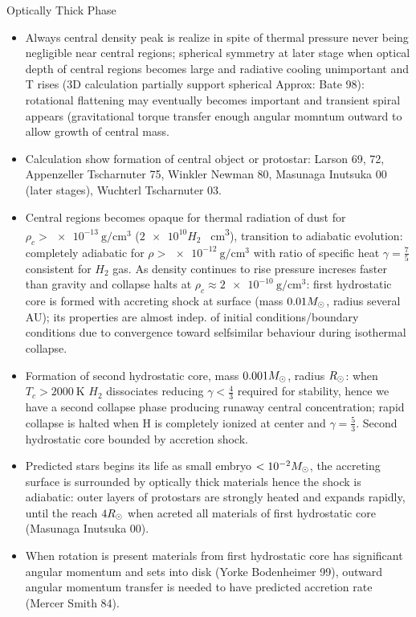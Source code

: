 \begin{frame}{Optically Thick Phase}
    \begin{itemize}
        \item Always central density peak is realize in spite of thermal pressure never being negligible near central regions; spherical symmetry at later stage when optical depth of central regions becomes large and radiative cooling unimportant and T rises (3D calculation partially support spherical Approx: Bate 98): rotational flattening may eventually becomes important and transient spiral appears (gravitational torque transfer enough angular momntum outward to allow growth of central mass.
            \item Calculation show formation of central object or protostar: Larson 69, 72, Appenzeller Tscharnuter 75, Winkler Newman 80, Masunaga Inutsuka 00 (later stages), Wuchterl Tscharnuter 03.
            \item Central regions becomes opaque for thermal radiation of dust for $\rho_c>\SI{e-13}{\gram\per\cubic\cm}$ ($\num{2e10} H_2$ \si{\per\cubic\cm}), transition to adiabatic evolution: completely adiabatic for $\rho>\SI{e-12}{\gram\per\cubic\cm}$ with ratio of specific heat $\gamma=\frac{7}{5}$ consistent for $H_2$ gas. As density continues to rise pressure increses faster than gravity and collapse halts at $\rho_c\approx\SI{2e-10}{\gram\per\cubic\cm}$: first hydrostatic core is formed with accreting shock at surface (mass $0.01 M_{\odot}{}$, radius several AU); its properties are almost indep. of initial conditions/boundary conditions due to convergence toward selfsimilar behaviour during isothermal collapse.
            \item Formation of second hydrostatic core, mass $0.001M_{\odot}{}$, radius $R_{\odot}{}$: when $T_c>\SI{2000}{\kelvin}$ $H_2$ dissociates reducing $\gamma<\frac{4}{3}$ required for stability, hence we have a second collapse phase producing runaway central concentration; rapid collapse is halted when H is completely ionized at center and $\gamma=\frac{5}{3}$. Second hydrostatic core bounded by accretion shock.
            \item Predicted stars begins its life as small embryo $<\num{e-2}M_{\odot}{}$, the accreting surface is surrounded by optically thick materials hence the shock is adiabatic: outer layers of protostars are strongly heated and expands rapidly, until the reach $4R_{\odot}{}$ when acreted all materials of first hydrostatic core (Masunaga Inutsuka 00).
            \item When rotation is present materials from first hydrostatic core has significant angular momentum and sets into disk (Yorke Bodenheimer 99), outward angular momentum transfer is needed to have predicted accretion rate (Mercer Smith 84).
    \end{itemize}
\end{frame}

